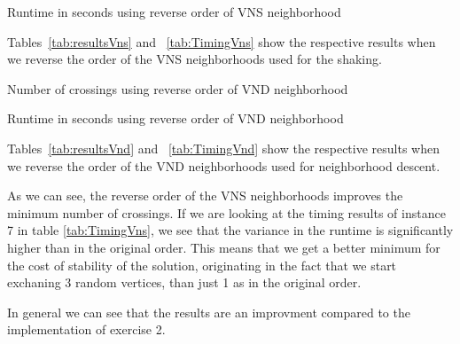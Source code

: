 \documentclass{scrartcl}
\begin{document}
\begin{table}[H]
  \centering
  \scriptsize
  
\caption{Runtime in seconds using reverse order of VNS neighborhood}
\label{tab:TimingVns}
\end{table}



Tables~\ref{tab:resultsVns} and ~\ref{tab:TimingVns} show the respective results when we reverse
the order of the VNS neighborhoods used for the shaking.

\begin{table}[H]
  \centering
  \scriptsize
  
\caption{Number of crossings using reverse order of VND neighborhood}
\label{tab:resultsVnd}
\end{table}

\begin{table}[H]
  \centering
  \scriptsize
  
\caption{Runtime in seconds using reverse order of VND neighborhood}
\label{tab:TimingVnd}
\end{table}

Tables~\ref{tab:resultsVnd} and ~\ref{tab:TimingVnd} show the respective results when we reverse
the order of the VND neighborhoods used for neighborhood descent.



As we can see, the reverse order of the VNS neighborhoods improves the minimum number of crossings. If we are looking
at the timing results of instance 7 in table \ref{tab:TimingVns}, we see that the variance in the runtime is significantly
higher than in the original order. This means that we get a better minimum for the cost of stability of the solution,
originating in the fact that we start exchaning 3 random vertices, than just 1 as in the original order.

In general we can see that the results are an improvment compared to the implementation of exercise 2.
\end{document}

